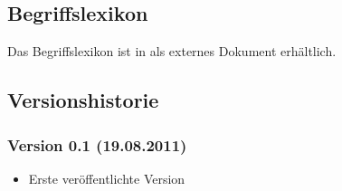 \documentclass[a4paper,10pt,titlepage]{article}
\begin{document}
\subsection{Begriffslexikon}

Das Begriffslexikon ist in als externes Dokument erhältlich.

\clearpage
\subsection{Versionshistorie}

	\subsubsection*{Version 0.1 (19.08.2011)}
	\begin{itemize}
		\item Erste veröffentlichte Version
	\end{itemize}
\end{document}
